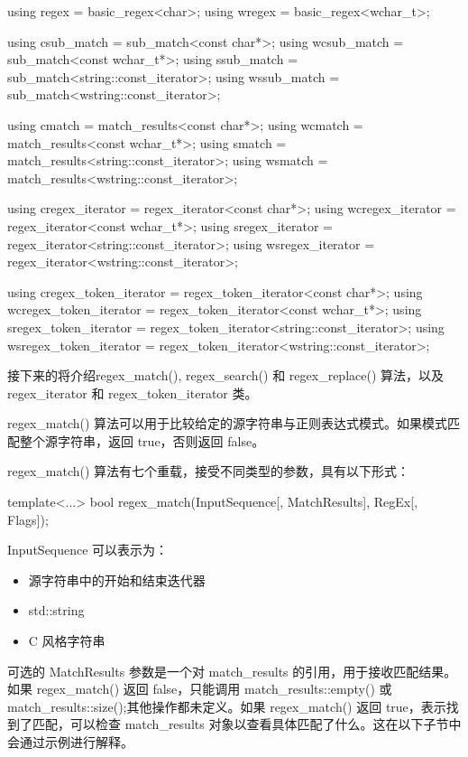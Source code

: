 \begin{cpp}
using regex = basic_regex<char>;
using wregex = basic_regex<wchar_t>;

using csub_match = sub_match<const char*>;
using wcsub_match = sub_match<const wchar_t*>;
using ssub_match = sub_match<string::const_iterator>;
using wssub_match = sub_match<wstring::const_iterator>;

using cmatch = match_results<const char*>;
using wcmatch = match_results<const wchar_t*>;
using smatch = match_results<string::const_iterator>;
using wsmatch = match_results<wstring::const_iterator>;

using cregex_iterator = regex_iterator<const char*>;
using wcregex_iterator = regex_iterator<const wchar_t*>;
using sregex_iterator = regex_iterator<string::const_iterator>;
using wsregex_iterator = regex_iterator<wstring::const_iterator>;

using cregex_token_iterator = regex_token_iterator<const char*>;
using wcregex_token_iterator = regex_token_iterator<const wchar_t*>;
using sregex_token_iterator = regex_token_iterator<string::const_iterator>;
using wsregex_token_iterator = regex_token_iterator<wstring::const_iterator>;
\end{cpp}

接下来的将介绍regex\_match(), regex\_search() 和 regex\_replace() 算法，以及 regex\_iterator 和 regex\_token\_iterator 类。


regex\_match() 算法可以用于比较给定的源字符串与正则表达式模式。如果模式匹配整个源字符串，返回 true，否则返回 false。

regex\_match() 算法有七个重载，接受不同类型的参数，具有以下形式：

\begin{cpp}
template<...>
bool regex_match(InputSequence[, MatchResults], RegEx[, Flags]);
\end{cpp}

InputSequence 可以表示为：

\begin{itemize}
\item
源字符串中的开始和结束迭代器

\item
std::string

\item
C 风格字符串
\end{itemize}

可选的 MatchResults 参数是一个对 match\_results 的引用，用于接收匹配结果。如果 regex\_match() 返回 false，只能调用 match\_results::empty() 或 match\_results::size();其他操作都未定义。如果 regex\_match() 返回 true，表示找到了匹配，可以检查 match\_results 对象以查看具体匹配了什么。这在以下子节中会通过示例进行解释。

